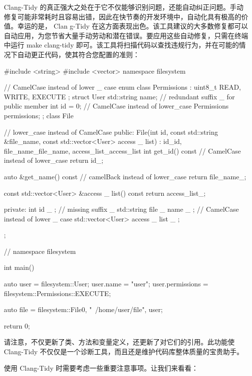
Clang-Tidy 的真正强大之处在于它不仅能够识别问题，还能自动纠正问题。手动修复可能非常耗时且容易出错，因此在快节奏的开发环境中，自动化具有极高的价值。幸运的是， Clan g-Tidy 在这方面表现出色。该工具建议的大多数修复都可以自动应用，为您节省大量手动劳动和潜在错误。要应用这些自动修复，只需在终端中运行 make clang-tidy 即可。该工具将扫描代码以查找违规行为，并在可能的情况下自动更正代码，使其符合您配置的准则：

\begin{cpp}
#include <string>
#include <vector>
namespace filesystem { // CamelCase instead of lower _ case
enum class Permissions : uint8_t { READ, WRITE, EXECUTE };
struct User {
    std::string name; // redundant suffix _ for public member
    int id = 0; // CamelCase instead of lower_case
    Permissions permissions;
};
class File { // lower_case instead of CamelCase
    public:
    File(int id, const std::string &file_name,
        const std::vector<User> access _ list)
        : id_{id}, file_name_{file_name}, access_list_{access_list} {}
    int get_id() const // CamelCase instead of lower_case
    {
        return id_;
    }

    auto &get_name() const // camelBack instead of lower_case
    {
        return file_name_;
    }

    const std::vector<User> &access _ list() const { return access_list_; }

private:
    int id _ ; // missing suffix _
    std::string file _ name _ ; // CamelCase instead of lower _ case
    std::vector<User> access _ list _ ;
};
} // namespace filesystem

int main() {
    auto user = filesystem::User{};
    user.name = "user";
    user.permissions = filesystem::Permissions::EXECUTE;

    auto file = filesystem::File{0, "~/home/user/file", {user}};

    return 0;
}
\end{cpp}

请注意，不仅更新了类、方法和变量定义，还更新了对它们的引用。此功能使 Clang-Tidy 不仅仅是一个诊断工具，而且还是维护代码库整体质量的宝贵助手。


使用 Clang-Tidy 时需要考虑一些重要注意事项。让我们来看看：

